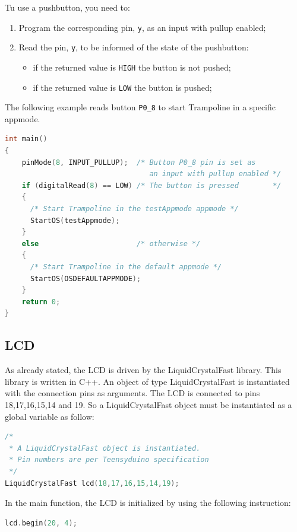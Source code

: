 \documentclass[11pt]{report}
\begin{document}
Tu use a pushbutton, you need to:
\begin{enumerate}
\item Program the corresponding pin, {\tt y}, as an input with pullup enabled;
\item Read the pin, {\tt y}, to be informed of the state of the pushbutton:
    \begin{itemize}
        \item if the returned value is {\tt HIGH} the button is not pushed;
        \item if the returned value is {\tt LOW} the button is pushed;
    \end{itemize}
\end{enumerate}

The following example reads button {\tt P0_8} to start Trampoline in a specific appmode.

\begin{lstlisting}[language=C]
int main()
{
    pinMode(8, INPUT_PULLUP);  /* Button P0_8 pin is set as
                                  an input with pullup enabled */
    if (digitalRead(8) == LOW) /* The button is pressed        */
    {
      /* Start Trampoline in the testAppmode appmode */
      StartOS(testAppmode);
    }
    else                       /* otherwise */
    {
      /* Start Trampoline in the default appmode */
      StartOS(OSDEFAULTAPPMODE);
    }
    return 0;
}
\end{lstlisting}

\subsection{LCD}

As already stated, the LCD is driven by the LiquidCrystalFast library. This library is written in C++. An object of type LiquidCrystalFast is instantiated with the connection pins as arguments. The LCD is connected to pins 18,17,16,15,14 and 19. So a LiquidCrystalFast object must be instantiated as a global variable as follow:

\begin{lstlisting}[language=C]
/*
 * A LiquidCrystalFast object is instantiated.
 * Pin numbers are per Teensyduino specification
 */
LiquidCrystalFast lcd(18,17,16,15,14,19);
\end{lstlisting}

In the main function, the LCD is initialized by using the following instruction:

\begin{lstlisting}[language=C]
  lcd.begin(20, 4);
\end{lstlisting}
\end{document}

